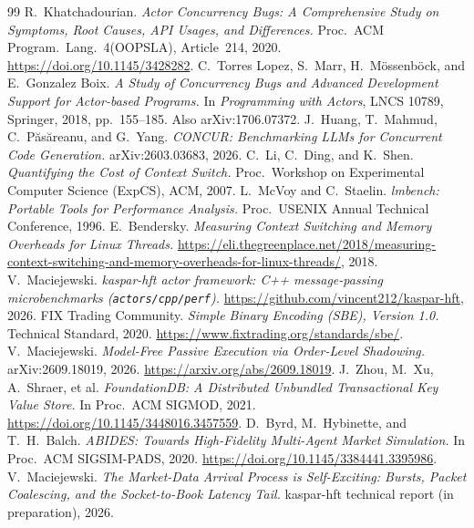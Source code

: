 \documentclass[11pt]{article}
\begin{document}
\begin{thebibliography}{99}
  R.~Khatchadourian.
  \emph{Actor Concurrency Bugs: A Comprehensive Study on Symptoms, Root Causes,
  API Usages, and Differences.} Proc.\ ACM Program.\ Lang.\ 4(OOPSLA),
  Article~214, 2020. \url{https://doi.org/10.1145/3428282}.
 C.~Torres Lopez, S.~Marr, H.~M\"ossenb\"ock, and
  E.~Gonzalez Boix.
  \emph{A Study of Concurrency Bugs and Advanced Development Support for
  Actor-based Programs.} In \emph{Programming with Actors}, LNCS 10789,
  Springer, 2018, pp.~155--185. Also arXiv:1706.07372.
 J.~Huang, T.~Mahmud, C.~P{\u a}s{\u a}reanu, and G.~Yang.
  \emph{CONCUR: Benchmarking LLMs for Concurrent Code Generation.}
  arXiv:2603.03683, 2026.
 C.~Li, C.~Ding, and K.~Shen.
  \emph{Quantifying the Cost of Context Switch.} Proc.\ Workshop on Experimental
  Computer Science (ExpCS), ACM, 2007.
 L.~McVoy and C.~Staelin.
  \emph{lmbench: Portable Tools for Performance Analysis.}
  Proc.\ USENIX Annual Technical Conference, 1996.
 E.~Bendersky.
  \emph{Measuring Context Switching and Memory Overheads for Linux Threads.}
  \url{https://eli.thegreenplace.net/2018/measuring-context-switching-and-memory-overheads-for-linux-threads/},
  2018.
 V.~Maciejewski.
  \emph{kaspar-hft actor framework: C++ message-passing microbenchmarks
  (\texttt{actors/cpp/perf}).}
  \url{https://github.com/vincent212/kaspar-hft}, 2026.
 FIX Trading Community.
  \emph{Simple Binary Encoding (SBE), Version 1.0.} Technical Standard, 2020.
  \url{https://www.fixtrading.org/standards/sbe/}.
 V.~Maciejewski.
  \emph{Model-Free Passive Execution via Order-Level Shadowing.}
  arXiv:2609.18019, 2026. \url{https://arxiv.org/abs/2609.18019}.
 J.~Zhou, M.~Xu, A.~Shraer, et al.
  \emph{FoundationDB: A Distributed Unbundled Transactional Key Value Store.}
  In Proc.\ ACM SIGMOD, 2021. \url{https://doi.org/10.1145/3448016.3457559}.
 D.~Byrd, M.~Hybinette, and T.~H.~Balch.
  \emph{ABIDES: Towards High-Fidelity Multi-Agent Market Simulation.}
  In Proc.\ ACM SIGSIM-PADS, 2020. \url{https://doi.org/10.1145/3384441.3395986}.
 V.~Maciejewski.
  \emph{The Market-Data Arrival Process is Self-Exciting: Bursts, Packet
  Coalescing, and the Socket-to-Book Latency Tail.} kaspar-hft technical report
  (in preparation), 2026.
\end{thebibliography}
\end{document}
